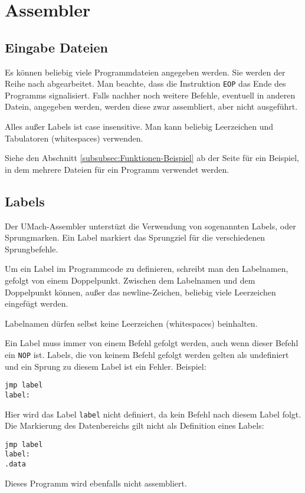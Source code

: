 \section{Assembler}

\subsection{Eingabe Dateien}

Es können beliebig viele Programmdateien angegeben werden. Sie werden der
Reihe nach abgearbeitet. Man beachte, dass die Instruktion \texttt{EOP} das
Ende des Programms signalisiert. Falls nachher noch weitere Befehle, eventuell
in anderen Datein, angegeben werden, werden diese zwar assembliert, aber nicht
ausgeführt.

Alles außer Labels ist case insensitive. Man kann beliebig Leerzeichen und
Tabulatoren (whitespaces) verwenden.


Siehe den Abschnitt \ref{subsubsec:Funktionen-Beispiel} ab der Seite
\pageref{subsubsec:Funktionen-Beispiel} für ein Beispiel, in dem mehrere Dateien
für ein Programm verwendet werden.

\subsection{Labels}

Der UMach-Assembler unterstüzt die Verwendung von sogenannten \glqq Labels\grqq,
oder Sprungmarken. Ein Label markiert das Sprungziel für die verschiedenen
Sprungbefehle.

Um ein Label im Programmcode zu definieren, schreibt man den
Labelnamen, gefolgt von einem Doppelpunkt. Zwischen dem Labelnamen und dem
Doppelpunkt können, außer das \glqq newline\grqq-Zeichen, beliebig viele
Leerzeichen eingefügt werden.


Labelnamen dürfen selbst keine Leerzeichen (whitespaces) beinhalten.

Ein Label muss immer von einem Befehl gefolgt werden, auch wenn dieser Befehl
ein \texttt{NOP} ist. Labels, die von keinem Befehl gefolgt werden gelten als
undefiniert und ein Sprung zu diesem Label ist ein Fehler. Beispiel:
\begin{lstlisting}
jmp label
label:
\end{lstlisting}
Hier wird das Label \texttt{label} nicht definiert, da kein Befehl nach diesem
Label folgt. Die Markierung des Datenbereichs gilt nicht als Definition eines
Labels:
\begin{lstlisting}
jmp label
label:
.data
\end{lstlisting}
Dieses Programm wird ebenfalls nicht assembliert.

